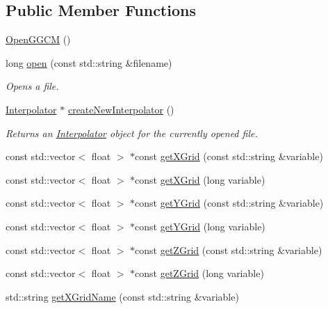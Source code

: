 \subsection*{Public Member Functions}
\begin{DoxyCompactItemize}
\item 
\hyperlink{classccmc_1_1_open_g_g_c_m_a715c1d53f3f1a7f86335cf1d4a0f2d49}{Open\-G\-G\-C\-M} ()
\item 
long \hyperlink{classccmc_1_1_open_g_g_c_m_a899907309758135dbabc0d3c7b465900}{open} (const std\-::string \&filename)
\begin{DoxyCompactList}\small\item\em Opens a file. \end{DoxyCompactList}\item 
\hyperlink{classccmc_1_1_interpolator}{Interpolator} $\ast$ \hyperlink{classccmc_1_1_open_g_g_c_m_acb2b4bd259e7dbe3d0cce0f3261408fc}{create\-New\-Interpolator} ()
\begin{DoxyCompactList}\small\item\em Returns an \hyperlink{classccmc_1_1_interpolator}{Interpolator} object for the currently opened file. \end{DoxyCompactList}\item 
const std\-::vector$<$ float $>$ $\ast$const \hyperlink{classccmc_1_1_open_g_g_c_m_a8c172438ab77813c8f7d9aa469880ef7}{get\-X\-Grid} (const std\-::string \&variable)
\item 
const std\-::vector$<$ float $>$ $\ast$const \hyperlink{classccmc_1_1_open_g_g_c_m_a1941051d7f42a047f1b98641c377ccc0}{get\-X\-Grid} (long variable)
\item 
const std\-::vector$<$ float $>$ $\ast$const \hyperlink{classccmc_1_1_open_g_g_c_m_acfddf469faddcd316c526984498a363a}{get\-Y\-Grid} (const std\-::string \&variable)
\item 
const std\-::vector$<$ float $>$ $\ast$const \hyperlink{classccmc_1_1_open_g_g_c_m_af35f6bd0be73508e6d8ccff87f255847}{get\-Y\-Grid} (long variable)
\item 
const std\-::vector$<$ float $>$ $\ast$const \hyperlink{classccmc_1_1_open_g_g_c_m_a855b01fafc8c5b01426e2aa5e68b0d6e}{get\-Z\-Grid} (const std\-::string \&variable)
\item 
const std\-::vector$<$ float $>$ $\ast$const \hyperlink{classccmc_1_1_open_g_g_c_m_a46935e203f1c7c2243de82d7d0c5c09b}{get\-Z\-Grid} (long variable)
\item 
std\-::string \hyperlink{classccmc_1_1_open_g_g_c_m_a00a92fbc85a43f76c71600a6f0892ba3}{get\-X\-Grid\-Name} (const std\-::string \&variable)

\end{DoxyCompactItemize}
